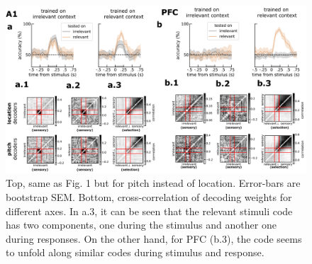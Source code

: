 \documentclass[12pt]{article}
\begin{document}
\begin{figure}
\centering
        \includegraphics[width=\textwidth]{figures/FigS5.pdf}
    \caption{Top, same as Fig. 1 but for pitch instead of location. Error-bars are bootstrap SEM. Bottom, cross-correlation of decoding weights for different axes. In a.3, it can be seen that the relevant stimuli code has two components, one during the stimulus and another one during responses. On the other hand, for PFC (b.3), the code seems to unfold along similar codes during stimulus and response.} 
    \label{figS5}
\end{figure}


\end{document}

